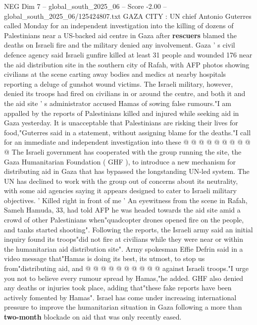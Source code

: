 \begin{textsample}{NEG Dim 7 – global\_south\_2025\_06 – Score -2.00 – global\_south\_2025\_06/125424807.txt}  \label{ex:f7_neg_053}
GAZA CITY : UN chief Antonio Guterres called Monday for an independent investigation into the killing of dozens of Palestinians near a US-backed aid centre in Gaza after \textbf{rescuers} blamed the deaths on Israeli fire and the military denied any involvement.
Gaza ' s civil defence agency said Israeli gunfire killed at least 31 people and wounded 176 near the aid distribution site in the southern city of Rafah, with AFP photos showing civilians at the scene carting away bodies and medics at nearby hospitals reporting a deluge of gunshot wound victims.
The Israeli military, however, denied its troops had fired on civilians in or around the centre, and both it and the aid site ' s administrator accused Hamas of sowing false rumours."I am appalled by the reports of Palestinians killed and injured while seeking aid in Gaza yesterday.
It is unacceptable that Palestinians are risking their lives for food,"Guterres said in a statement, without assigning blame for the deaths."I call for an immediate and independent investigation into these @ @ @ @ @ @ @ @ @ @ The Israeli government has cooperated with the group running the site, the Gaza Humanitarian Foundation ( GHF ), to introduce a new mechanism for distributing aid in Gaza that has bypassed the longstanding UN-led system.
The UN has declined to work with the group out of concerns about its neutrality, with some aid agencies saying it appears designed to cater to Israeli military objectives. ' Killed right in front of me ' An eyewitness from the scene in Rafah, Sameh Hamuda, 33, had told AFP he was headed towards the aid site amid a crowd of other Palestinians when"quadcopter drones opened fire on the people, and tanks started shooting".
Following the reports, the Israeli army said an initial inquiry found its troops"did not fire at civilians while they were near or within the humanitarian aid distribution site".
Army spokesman Effie Defrin said in a video message that"Hamas is doing its best, its utmost, to stop us from"distributing aid, and @ @ @ @ @ @ @ @ @ @ against Israeli troops."I urge you not to believe every rumour spread by Hamas,"he added.
GHF also denied any deaths or injuries took place, adding that"these fake reports have been actively fomented by Hamas".
Israel has come under increasing international pressure to improve the humanitarian situation in Gaza following a more than \textbf{two-month} blockade on aid that was only recently eased.

\end{textsample}
